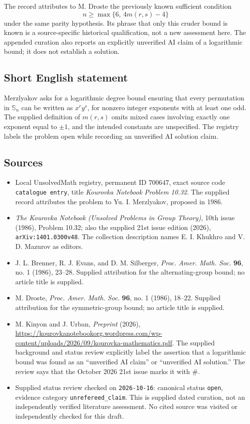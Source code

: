 \documentclass[11pt]{article}
\begin{document}
The record attributes to M. Droste the previously known sufficient condition
\[
 n\ge\max\{6,\ 4m(r,s)-4\}
\]
under the same parity hypothesis. Its phrase that only this cruder bound is known is a source-specific historical qualification, not a new assessment here. The appended curation also reports an explicitly unverified AI claim of a logarithmic bound; it does not establish a solution.
\subsection{Short English statement}
Merzlyakov asks for a logarithmic degree bound ensuring that every permutation in \(\mathbb S_n\) can be written as \(x^ry^s\), for nonzero integer exponents with at least one odd. The supplied definition of \(m(r,s)\) omits mixed cases involving exactly one exponent equal to \(\pm1\), and the intended constants are unspecified. The registry labels the problem open while recording an unverified AI solution claim.
\subsection{Sources}
\begin{itemize}
\item Local UnsolvedMath registry, permanent ID \(700647\), exact source code \texttt{catalogue entry}, title \emph{Kourovka Notebook Problem 10.32}. The supplied record attributes the problem to Yu. I. Merzlyakov, proposed in 1986.
\item \emph{The Kourovka Notebook (Unsolved Problems in Group Theory)}, 10th issue (1986), Problem 10.32; also the supplied 21st issue edition (2026), \texttt{arXiv:1401.0300v48}. The collection description names E. I. Khukhro and V. D. Mazurov as editors.
\item J. L. Brenner, R. J. Evans, and D. M. Silberger, \emph{Proc. Amer. Math. Soc.} \textbf{96}, no. 1 (1986), 23--28. Supplied attribution for the alternating-group bound; no article title is supplied.
\item M. Droste, \emph{Proc. Amer. Math. Soc.} \textbf{96}, no. 1 (1986), 18--22. Supplied attribution for the symmetric-group bound; no article title is supplied.
\item M. Kinyon and J. Urban, \emph{Preprint} (2026), \url{https://kourovkanotebookorg.wordpress.com/wp-content/uploads/2026/09/kourovka-mathematics.pdf}. The supplied background and status review explicitly label the assertion that a logarithmic bound was found as an ``unverified AI claim'' or ``unverified AI solution.'' The review says that the October 2026 21st issue marks it with \(\#\).
\item Supplied status review checked on \texttt{2026-10-16}: canonical status \texttt{open}, evidence category \texttt{unrefereed\_claim}. This is supplied dated curation, not an independently verified literature assessment. No cited source was visited or independently checked for this draft.
\end{itemize}
\end{document}
